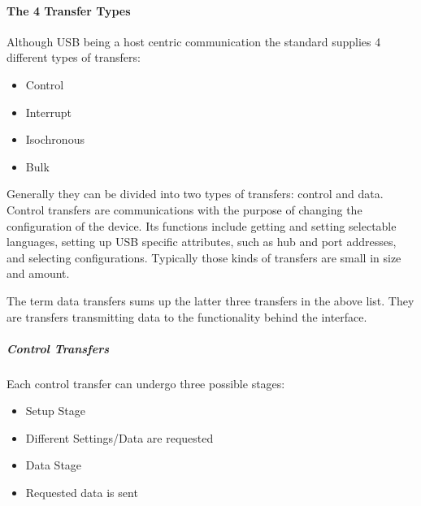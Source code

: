 \hypertarget{h.sndep0jf1bfd}{\paragraph{\texorpdfstring{{The 4 Transfer
Types}}{The 4 Transfer Types}}\label{h.sndep0jf1bfd}}

{Although USB being a host centric communication the standard supplies 4
different types of transfers: }

\begin{itemize}
\tightlist
\item
  {Control}
\item
  {Interrupt}
\item
  {Isochronous}
\item
  {Bulk}
\end{itemize}

{Generally they can be divided into two types of transfers: control and
data. Control transfers are communications with the purpose of changing
the configuration of the device. Its functions include getting and
setting selectable languages, setting up USB specific attributes, such
as hub and port addresses, and selecting configurations. Typically those
kinds of transfers are small in size and amount. }

{The term data transfers sums up the latter three transfers in the above
list. They are transfers transmitting data to the functionality behind
the interface. }

\hypertarget{h.90a05v4yh1c6}{\subparagraph{\texorpdfstring{{Control
Transfers}}{Control Transfers}}\label{h.90a05v4yh1c6}}

{Each control transfer can undergo three possible stages: }

\begin{itemize}
\tightlist
\item
  {Setup Stage}
\end{itemize}

\begin{itemize}
\tightlist
\item
  {D}{ifferent Settings/Data are requested}
\end{itemize}

\begin{itemize}
\tightlist
\item
  {Data Stage}
\end{itemize}

\begin{itemize}
\tightlist
\item
  {Requested data is sent}
\end{itemize}

